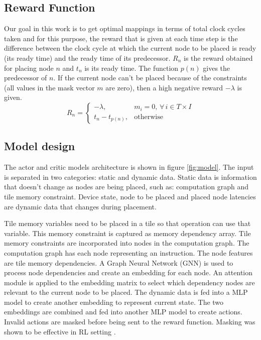 \subsection{Reward Function}
Our goal in this work is to get optimal mappings in terms of total clock cycles taken and for this purpose, the reward that is given at each time step is the difference between the clock cycle at which the current node to be placed is ready (its ready time) and the ready time of its predecessor. $R_n$ is the reward obtained for placing node $n$ and $t_n$ is its ready time. The function $p(n)$ gives the predecessor of $n$. If the current node can't be placed because of the constraints (all values in the mask vector $m$ are zero), then a high negative reward $-\lambda$ is given.
\[
  R_n =
  \begin{cases}
    -\lambda,& m_i = 0, \, \forall \, i \in T \times I \\
    t_n - t_{p(n)}, & \text{otherwise}
    
  \end{cases}
\]

\subsection{Model design}

The actor and critic models architecture is shown in figure \ref{fig:model}. 
The input is separated in two categories: static and dynamic data. 
Static data is information that doesn't change as nodes are being placed, such as: computation graph and tile memory constraint.
Device state, node to be placed and placed node latencies are dynamic data that changes during placement.

Tile memory variables need to be placed in a tile so that operation can use that variable. 
This memory constraint is captured as memory dependency array. 
Tile memory constraints are incorporated into nodes in the computation graph. 
The computation graph has each node representing an instruction. 
The node features are tile memory dependencies. 
A Graph Neural Network (GNN) is used to process node dependencies and create an embedding for each node. 
An attention module is applied to the embedding matrix to select which dependency nodes are relevant to the current node to be placed. The dynamic data is fed into a MLP model to 
create another embedding to represent current state. 
The two embeddings are combined and fed into another MLP model to 
create actions. 
Invalid actions are masked before being sent to the reward function. Masking was shown to be effective in RL setting \cite{Shengyi_mask}.

